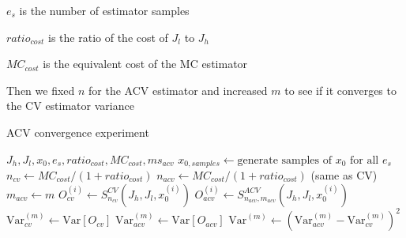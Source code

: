 \documentclass{article}
\begin{document}
$e_s$ is the number of estimator samples

$ratio_{cost}$ is the ratio of the cost of $J_l$ to $J_h$

$MC_{cost}$ is the equivalent cost of the MC estimator

Then we fixed $n$ for the ACV estimator and increased $m$ to see if it converges to the CV estimator variance
\begin{algorithm}
  \caption{ACV convergence experiment}
  \begin{algorithmic}
    \Require $J_h, J_l, x_0, e_s, ratio_{cost}, MC_{cost}, ms_{acv}$
    \State $x_{0,samples} \gets \text{generate samples of } x_0 \text{ for all } e_s$
    \State $n_{cv} \gets MC_{cost} / (1 + ratio_{cost})$
    \State $n_{acv} \gets MC_{cost} / (1 + ratio_{cost})$ (same as CV)
    \State $m_{acv} \gets m$
    \State $O_{cv}^{(i)} \gets S_{n_{cv}}^{CV}(J_h, J_l, x_0^{(i)})$
    \State $O_{acv}^{(i)} \gets S_{n_{acv},m_{acv}}^{ACV}(J_h, J_l, x_0^{(i)})$
    \EndFor
    \State $\text{Var}_{cv}^{(m)} \gets \text{Var}[O_{cv}]$
    \State $\text{Var}_{acv}^{(m)} \gets \text{Var}[O_{acv}]$
    \State $\text{Var}^{(m)} \gets (\text{Var}_{acv}^{(m)} - \text{Var}_{cv}^{(m)})^2$
    \EndFor
  \end{algorithmic}
\end{algorithm}
\end{document}
